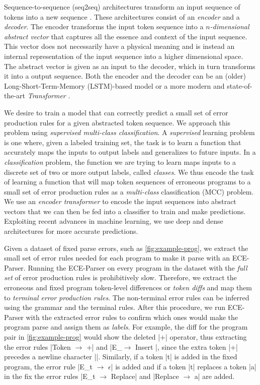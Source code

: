 Sequence-to-sequence (seq2seq) architectures transform an input sequence
of tokens into a new sequence \citep{Sutskever_2014}. These architectures
consist of an \emph{encoder} and a \emph{decoder}. The encoder transforms the
input token sequence into a \emph{$n$-dimensional abstract vector} that captures
all the essence and context of the input sequence. This vector does not
necessarily have a physical meaning and is instead an internal representation of
the input sequence into a higher dimensional space. The abstract vector is given
as an input to the decoder, which in turn transforms it into a output sequence.
Both the encoder and the decoder can be an (older) Long-Short-Term-Memory
(LSTM)-based model \citep{Hochreiter_1997} or a more modern and state-of-the-art
\emph{Transformer} \citep{Vaswani_2017}.

We desire to train a model that can correctly predict a small set of error
production rules for a given abstracted token sequence. We approach this
problem using \emph{supervised multi-class classification}. A \emph{supervised}
learning problem is one where, given a labeled training set, the task is to
learn a function that accurately maps the inputs to output labels and
generalizes to future inputs. In a \emph{classification} problem, the function
we are trying to learn maps inputs to a discrete set of two or more output
labels, called \emph{classes}. We thus encode the task of learning a
function that will map token sequences of erroneous programs to a small set of
error production rules as a \emph{multi-class} classification (MCC) problem. We
use an \emph{encoder transformer} to encode the input sequences into abstract
vectors that we can then be fed into a \emph{\dnn} classifier to train and make
predictions. Exploiting recent advances in machine learning, we use deep and
dense architectures \citep{Schmidhuber_2015} for more accurate predictions.

Given a dataset of fixed parse errors, such as \autoref{fig:example-prog}, we
extract the small set of error rules needed for each program to make it parse
with an ECE-Parser. Running the ECE-Parser on every program in the dataset with
the \emph{full set} of error production rules is prohibitively slow. Therefore,
we extract the erroneous and fixed program token-level differences or
\emph{token diffs} and map them to \emph{terminal error production rules}. The
non-terminal error rules can be inferred using the grammar and the terminal
rules. After this procedure, we run ECE-Parser with the extracted error rules to
confirm which ones would make the program parse and assign them as
\emph{labels}. For example, the diff for the program pair in
\autoref{fig:example-prog} would show the deleted |+| operator, thus extracting
the error rules |Token $\rightarrow$ +| and |E_\n $\rightarrow$ Insert \n|,
since the extra token |+| precedes a newline character |\n|. Similarly, if a
token |t| is added in the fixed program, the error rule
%
|E_t $\rightarrow$ $\epsilon$| is added and if a token |t| replaces a token |a|
in the fix the error rules |E_t $\rightarrow$ Replace| and
%
|Replace $\rightarrow$ a| are added.


